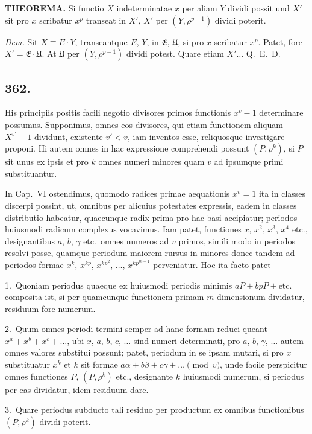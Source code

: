 \documentclass[12pt,a4paper]{article}
\begin{document}
\textbf{THEOREMA.} Si functio $X$ indeterminatae $x$ per aliam $Y$ dividi possit und $X'$ sit pro $x$ scribatur $x^p$ transeat in $X'$, $X'$ per $(Y,\rho^{p-1})$ dividi poterit.

\textit{Dem.} Sit $X\equiv E\cdot Y$, transeantque $E$, $Y$, in $\mathfrak{E}$, $\mathfrak{U}$, si pro $x$ scribatur $x^p$. Patet, fore $X'=\mathfrak{E}\cdot\mathfrak{U}$. At $\mathfrak{U}$ per $(Y,\rho^{p-1})$ dividi potest. Quare etiam $X'\ldots$ Q.~E.~D.

\subsection*{362.}

His principiis positis facili negotio divisores primos functionis $x^v-1$ determinare possumus. Supponimus, omnes eos divisores, qui etiam functionem aliquam $X^{v'}-1$ dividunt, existente $v'<v$, iam inventos esse, reliquosque investigare proponi. Hi autem omnes in hac expressione comprehendi possunt $(P,\rho^k)$, si $P$ sit unus ex ipsis et pro $k$ omnes numeri minores quam $v$ ad ipsumque primi substituantur.

In Cap.~VI ostendimus, quomodo radices primae aequationis $x^v=1$ ita in classes discerpi possint, ut, omnibus per alicuius potestates expressis, eadem in classes distributio habeatur, quaecunque radix prima pro hac basi accipiatur; periodos huiusmodi radicum complexus vocavimus. Iam patet, functiones $x$, $x^2$, $x^3$, $x^4$ etc., designantibus $a$, $b$, $\gamma$ etc.~omnes numeros ad $v$ primos, simili modo in periodos resolvi posse, quamque periodum maiorem rursus in minores donec tandem ad periodos formae $x^k$, $x^{kp}$, $x^{kp^2}$, $\ldots$, $x^{kp^{m-1}}$ perveniatur. Hoc ita facto patet

1.~Quoniam periodus quaeque ex huiusmodi periodis minimis $aP+bpP+\text{etc.}$ composita ist, si per quamcunque functionem primam $m$ dimensionum dividatur, residuum fore numerum.

2.~Quum omnes periodi termini semper ad hanc formam reduci queant $x^a+x^b+x^c+\ldots$, ubi $x$, $a$, $b$, $c$, $\ldots$ sind numeri determinati, pro $a$, $b$, $\gamma$, $\ldots$ autem omnes valores substitui possunt; patet, periodum in se ipsam mutari, si pro $x$ substituatur $x^k$ et $k$ sit formae $a\alpha+b\beta+c\gamma+\ldots\pmod{v}$, unde facile perspicitur omnes functiones $P$, $(P,\rho^k)$ etc., designante $k$ huiusmodi numerum, si periodus per eas dividatur, idem residuum dare.

3.~Quare periodus subducto tali residuo per productum ex omnibus functionibus $(P,\rho^k)$ dividi poterit.
\end{document}
